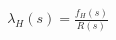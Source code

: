 \documentclass[preview]{standalone}
\begin{document}
\begin{align*}
\lambda_H(s)=\frac{f_H(s)}{R(s)}
\end{align*}
\end{document}
